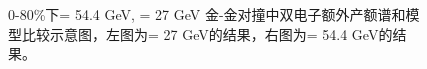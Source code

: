 \begin{figure}[htb]
\begin{subfigure}[b]{0.45\textwidth}
        \caption{}
        \label{fig:Model_Compare_54}
    \end{subfigure}
    \caption[0-80\%下\sNN = 54.4 GeV, \sNN = 27 GeV 金-金对撞中双电子额外产额谱和模型比较示意图]{0-80\%下\sNN = 54.4 GeV, \sNN = 27 GeV 金-金对撞中双电子额外产额谱和模型比较示意图，左图为\sNN = 27 GeV的结果，右图为\sNN = 54.4 GeV的结果。}
    \label{fig:Model_Compare}
\end{figure}

